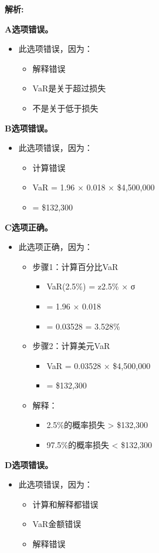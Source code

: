 \documentclass{article}
\newenvironment{explanation}
{\textbf{解析:}\par}
{\par}
\begin{document}
\begin{explanation}
    \textbf{A选项错误。}
    \begin{itemize}
        \item 此选项错误，因为：
        \begin{itemize}
            \item 解释错误
            \item VaR是关于超过损失
            \item 不是关于低于损失
        \end{itemize}
    \end{itemize}
    \textbf{B选项错误。}
    \begin{itemize}
        \item 此选项错误，因为：
        \begin{itemize}
            \item 计算错误
            \item VaR = 1.96 × 0.018 × \$4,500,000
            \item = \$132,300
        \end{itemize}
    \end{itemize}
    \textbf{C选项正确。}
    \begin{itemize}
        \item 此选项正确，因为：
        \begin{itemize}
            \item 步骤1：计算百分比VaR
            \begin{itemize}
                \item VaR(2.5\%) = z2.5\% × σ
                \item = 1.96 × 0.018
                \item = 0.03528 = 3.528\%
            \end{itemize}
            \item 步骤2：计算美元VaR
            \begin{itemize}
                \item VaR = 0.03528 × \$4,500,000
                \item = \$132,300
            \end{itemize}
            \item 解释：
            \begin{itemize}
                \item 2.5\%的概率损失 > \$132,300
                \item 97.5\%的概率损失 < \$132,300
            \end{itemize}
        \end{itemize}
    \end{itemize}
    \textbf{D选项错误。}
    \begin{itemize}
        \item 此选项错误，因为：
        \begin{itemize}
            \item 计算和解释都错误
            \item VaR金额错误
            \item 解释错误
        \end{itemize}
    \end{itemize}
\end{explanation}
\end{document}
